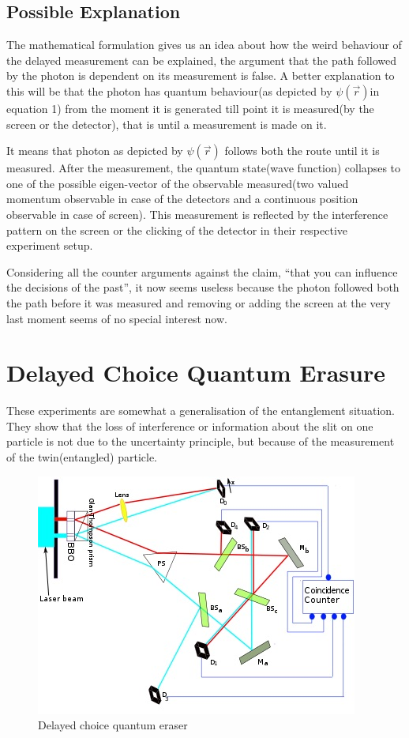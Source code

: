     \subsection{Possible Explanation}
    The mathematical formulation gives us an idea about how the weird behaviour of the delayed measurement can be explained, the argument that the path followed by the photon is dependent on its measurement is false. A better explanation to this will be that the photon has quantum behaviour(as depicted by $\psi(\Vec{r})$in equation 1) from the moment it is generated till point it is measured(by the screen or the detector), that is until a measurement is made on it. \\
    \par It means that photon as depicted by $\psi(\Vec{r})$ follows both the route until it is measured. After the measurement, the quantum state(wave function) collapses to one of the possible eigen-vector of the observable measured(two valued momentum observable in case of the detectors and a continuous position observable in case of screen). This measurement is reflected by the interference pattern on the screen or the clicking of the detector in their respective experiment setup.\\ 
    \par Considering all the counter arguments against the claim, ``that you can influence the decisions of the past'', it now seems useless because the photon followed both the path before it was measured and removing or adding the screen at the very last moment seems of no special interest now.
    \section{Delayed Choice Quantum Erasure}
    These experiments are somewhat a generalisation of the entanglement situation. They show that the loss of interference or information about the slit on one particle is not due to the uncertainty principle, but because of the measurement of the twin(entangled) particle.
    \begin{figure}[ht]
        \centering
        \includegraphics[scale = 0.7]{images/quantum_eraser.jpg}
        \caption{Delayed choice quantum eraser}
        \label{fig:my_label}
    \end{figure}
